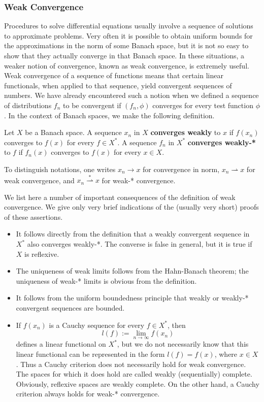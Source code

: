 \subsubsection{Weak Convergence}\label{subsec:weak-convergence}

Procedures to solve differential equations usually involve a sequence of solutions to approximate problems. Very often it is possible to obtain uniform bounds for the approximations in the norm of some Banach space, but it is not so easy to show that they actually converge in that Banach space. In these situations, a weaker notion of convergence, known as weak convergence, is extremely useful. Weak convergence of a sequence of functions means that certain linear functionals, when applied to that sequence, yield convergent sequences of numbers. We have already encountered such a notion when we defined a sequence of distributions $f_n$ to be convergent if $(f_n,\phi)$ converges for every test function $\phi$. In the context of Banach spaces, we make the following definition.

\begin{Definition}
\label{def:weak-and-weak-star-convergence}
Let $X$ be a Banach space. A sequence $x_n$ in $X$ \textbf{converges weakly} to $x$ if $f(x_n)$ converges to $f(x)$ for every $f\in X^*$. A sequence $f_n$ in $X^*$ \textbf{converges weakly-*} to $f$ if $f_n(x)$ converges to $f(x)$ for every $x\in X$.
\end{Definition}

To distinguish notations, one writes $x_n\to x$ for convergence in norm, $x_n\rightharpoonup x$ for weak convergence, and $x_n\overset{*}{\rightharpoonup}x$ for weak-* convergence.

\begin{Remark}
\label{rem:weak-convergence-consequences}
We list here a number of important consequences of the definition of weak convergence. We give only very brief indications of the (usually very short) proofs of these assertions.\begin{itemize}
\item It follows directly from the definition that a weakly convergent sequence in $X^*$ also converges weakly-*. The converse is false in general, but it is true if $X$ is reflexive.
\item The uniqueness of weak limits follows from the Hahn-Banach theorem; the uniqueness of weak-* limits is obvious from the definition.
\item It follows from the uniform boundedness principle that weakly or weakly-* convergent sequences are bounded.
\item If $f(x_n)$ is a Cauchy sequence for every $f\in X^*$, then
\[l(f):=\lim_{n\to\infty}f(x_n)\]
defines a linear functional on $X^*$, but we do not necessarily know that this linear functional can be represented in the form $l(f)=f(x)$, where $x\in X$. Thus a Cauchy criterion does not necessarily hold for weak convergence. The spaces for which it does hold are called weakly (sequentially) complete. Obviously, reflexive spaces are weakly complete. On the other hand, a Cauchy criterion always holds for weak-* convergence.
\end{itemize}
\end{Remark}

